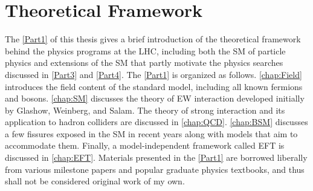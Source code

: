 \part{Theoretical Framework}
\label{Part1}
The \autoref{Part1} of this thesis gives a brief introduction of the theoretical framework behind the physics programs at the \ac{LHC}, including both the \ac{SM} of particle physics and extensions of the \ac{SM} that partly motivate the physics searches discussed in \autoref{Part3} and \autoref{Part4}. The \autoref{Part1} is organized as follows. \autoref{chap:Field} introduces the field content of the standard model, including all known fermions and bosons. \autoref{chap:SM} discusses the theory of \ac{EW} interaction developed initially by Glashow, Weinberg, and Salam. The theory of strong interaction and its application to hadron colliders are discussed in \autoref{chap:QCD}. \autoref{chap:BSM} discusses a few fissures exposed in the \ac{SM} in recent years along with models that aim to accommodate them. Finally, a model-independent framework called \ac{EFT} is discussed in \autoref{chap:EFT}. Materials presented in the \autoref{Part1} are borrowed liberally from various milestone papers and popular graduate physics textbooks, and thus shall not be considered original work of my own. 






